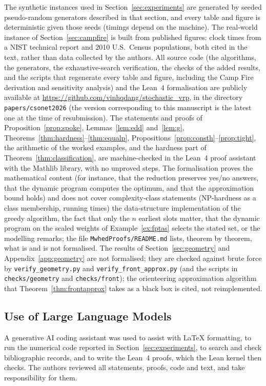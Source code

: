 \documentclass[pdflatex,sn-mathphys-ay]{sn-jnl}
\theoremstyle{thmstyleone}
\theoremstyle{thmstyletwo}
\theoremstyle{thmstylethree}
\begin{document}
The synthetic instances used in Section~\ref{sec:experiments} are
generated by seeded pseudo-random generators described in that section,
and every table and figure is deterministic given those seeds (timings
depend on the machine). The real-world instance of
Section~\ref{sec:campfire} is built from published figures: clock times
from a NIST technical report \citep{nist2021campfire} and 2010 U.S.\
Census populations, both cited in the text, rather than data collected by
the authors. All source code (the algorithms, the generators, the
exhaustive-search verification, the checks of the added results, and the
scripts that regenerate every table and figure, including the Camp Fire
derivation and sensitivity analysis) and the Lean~4 formalisation are
publicly available at \url{https://github.com/vinhqdang/stochastic_vrp}, in
the directory \texttt{papers/csonet2026} (the version corresponding to
this manuscript is the latest one at the time of resubmission).
The statements and proofs of Proposition~\ref{prop:spoke},
Lemmas~\ref{lem:edd} and~\ref{lem:g}, Theorems~\ref{thm:hardness}--\ref{thm:equalp},
Propositions~\ref{prop:consth}--\ref{prop:tight}, the arithmetic of the
worked examples, and the hardness part of
Theorem~\ref{thm:classification}, are machine-checked in the Lean~4 proof
assistant with the Mathlib library, with no unproved steps. The
formalisation proves the mathematical content (for instance, that the
reduction preserves yes/no answers, that the dynamic program computes the
optimum, and that the approximation bound holds) and does not cover
complexity-class statements (NP-hardness as a class membership, running
times) the data-structure implementation of the greedy algorithm, the fact that
only the $n$ earliest slots matter, that the dynamic program on the scaled
weights of Example~\ref{ex:fptas} selects the stated set, or the modelling
remarks; the file \texttt{MwhedProofs/README.md} lists, theorem by theorem, what is and
is not formalised. The results of Section~\ref{sec:geometry} and
Appendix~\ref{app:geometry} are not formalised; they are checked against
brute force by \texttt{verify\_geometry.py} and
\texttt{verify\_front\_approx.py} (and the scripts in
\texttt{checks/geometry} and \texttt{checks/front}); the orienteering
approximation algorithm that Theorem~\ref{thm:frontapprox} takes as a
black box is cited, not reimplemented.

\subsection*{Use of Large Language Models}
A generative AI coding assistant was used to assist with
LaTeX formatting, to run the numerical code reported in
Section~\ref{sec:experiments}, to search and check bibliographic records,
and to write the Lean~4 proofs, which the Lean kernel then checks. The
authors reviewed all statements, proofs, code and text, and take
responsibility for them.


\end{document}
